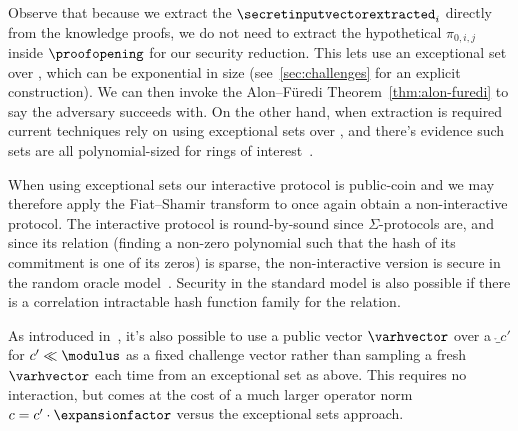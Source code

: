 Observe that because we extract the $\secretinputvectorextracted_i$ directly from the knowledge proofs, we do not need to extract the hypothetical $\pi_{0,i,j}$ inside $\proofopening$ for our security reduction. This lets use an exceptional set over \fring, which can be exponential in size (see~\cref{sec:challenges} for an explicit construction). We can then invoke the Alon--F{\"u}redi Theorem~\cref{thm:alon-furedi} to say the adversary succeeds with. On the other hand, when extraction is required current techniques rely on using exceptional sets over \ring, and there's evidence such sets are all polynomial-sized for rings of interest~\cite{C:AlbLai21}.

When using exceptional sets our interactive protocol is public-coin and we may therefore apply the Fiat--Shamir transform to once again obtain a non-interactive protocol. The interactive protocol is round-by-sound since $\Sigma$-protocols are, and since its relation (finding a non-zero polynomial such that the hash of its commitment is one of its zeros) is sparse, the non-interactive version is secure in the random oracle model~\cite{canettichlrr18}. Security in the standard model is also possible if there is a correlation intractable hash function family for the relation.

As introduced in~\cite{C:ACLMT22}, it's also possible to use a public \rsis vector $\varhvector$ over a $\ring_{c'}$ for $c' \ll \modulus$ as a fixed challenge vector rather than sampling a fresh $\varhvector$ each time from an exceptional set as above. This requires no interaction, but comes at the cost of a much larger operator norm $c = c' \cdot \expansionfactor$ versus the exceptional sets approach.

